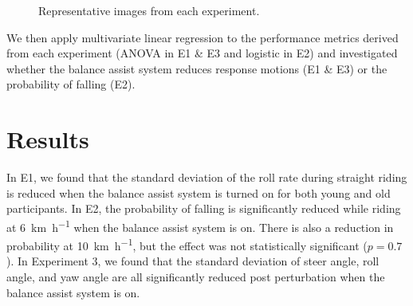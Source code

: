 \documentclass{icsc}
\def\kph{\kilo\meter\per\hour}
\begin{document}
\begin{figure}
  \begin{center}
    \caption{Representative images from each experiment.}
    \label{fig:experiments}
  \end{center}
\end{figure}

We then apply multivariate linear regression to the performance metrics derived
from each experiment (ANOVA in E1 \& E3 and logistic in E2) and investigated
whether the balance assist system reduces response motions (E1 \& E3) or the
probability of falling (E2).

\section{Results}
%
In E1, we found that the standard deviation of the roll rate during straight
riding is reduced when the balance assist system is turned on for both young
and old participants. In E2, the probability of falling is significantly
reduced while riding at 6~\si{\kph} when the balance assist system is on. There
is also a reduction in probability at 10~\si{\kph}, but the effect was not
statistically significant (\(p=0.7\)). In Experiment 3, we found that the
standard deviation of steer angle, roll angle, and yaw angle are all
significantly reduced post perturbation when the balance assist system is on.
\end{document}
